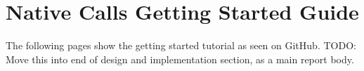 
\chapter{Native Calls Getting Started Guide}
\label{AppendixA} 

The following pages show the getting started tutorial as seen on GitHub. 
TODO: Move this into end of design and implementation section, as a main report body.


